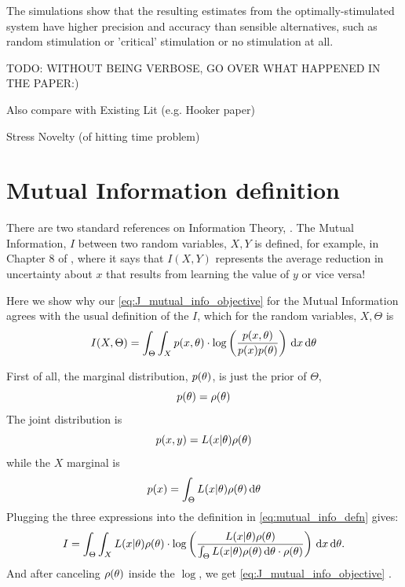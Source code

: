 The simulations show that the resulting estimates from the
optimally-stimulated system have higher precision and accuracy than sensible
alternatives, such as random stimulation or 'critical' stimulation or no
 stimulation at all.
 
TODO: WITHOUT BEING VERBOSE, GO OVER WHAT HAPPENED IN THE PAPER:)

Also compare with Existing Lit (e.g. Hooker paper)

Stress Novelty (of hitting time problem)
 

\clearpage
\section{Mutual Information definition}
\label{sec:mutual_info_defn} 

There are two standard references on Information Theory, 
\cite{Cover2006,MacKay2003}. The Mutual Information, $I$ between two random
variables, $X,Y$ is defined, for example, in Chapter 8 of \cite{MacKay2003},
where it says that $I(X,Y)$ represents the average reduction in uncertainty
about $x$ that results from learning the value of $y$ or vice versa! 

Here we show why our \cref{eq:J_mutual_info_objective} for the Mutual
Information agrees with the usual definition of the $I$,
which for the random variables, $X,\Theta$ is
\begin{equation} 
I(X,\Theta) = \int_\Theta \int_X p(x,{ \theta}) \cdot \log \left(
\frac{p(x,{ \theta})}{p(x)p({ \theta})}\right) \, \mathrm{d} x \, \mathrm{d} { \theta}
\label{eq:mutual_info_defn}
\end{equation}
 
First of all, the marginal distribution, $p({ \theta})$,  is just the prior of
$\Theta$, $$p({ \theta}) = \rho({ \theta})$$ The joint distribution is $$p(x,y) =
L(x|{ \theta})\rho({ \theta})$$ while the $X$ marginal is $$p(x) = \int_\Theta L(x|{ \theta})\rho({ \theta}) \, \mathrm{d} { \theta}$$
Plugging the three expressions into the definition in
\cref{eq:mutual_info_defn} gives:
\begin{equation}
I = \int_\Theta \int_X L(x|{ \theta})\rho({ \theta}) \cdot 
\log \left( \frac{L(x|{ \theta})\rho({ \theta}) }{\int_\Theta L(x|{ \theta})\rho({ \theta}) \, \mathrm{d} { \theta}
\cdot \rho({ \theta}) } \right)
\, \mathrm{d} x\, \mathrm{d} { \theta}.
\label{eq:mutual_info_prior_trajectory}
\end{equation}
And after canceling $\rho({ \theta})$ inside the $\log$, we get
\cref{eq:J_mutual_info_objective} .

\clearpage

